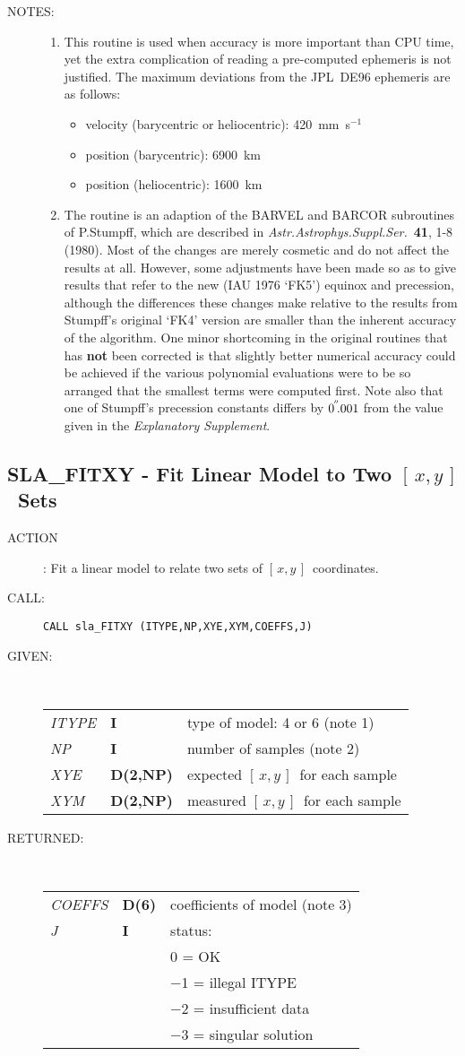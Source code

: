 \documentclass[11pt,twoside]{article}
\newcommand{\xlabel}[1]{}
\newcommand{\xy}        {$[\,x,y\,]$}
\newcommand{\arcsec}[2] {\arcseci{#1}$\hspace{-0.4em}.#2$}
\newcommand{\arcsec}[2] {
      {$#1\hspace{-0.05em}^{'\hspace{-0.1em}'}\hspace{-0.4em}.#2$}
   }
\newcommand{\arcseci}[1] {$#1\hspace{-0.05em}$\raisebox{-0.5ex}
                         {$^{'\hspace{-0.1em}'}$}}
\renewcommand{\arcseci}[1] {$#1\hspace{-0.05em}^{'\hspace{-0.1em}'}$}
\newcommand{\routine}[3]
{\hbadness=10000
  \vbox
  {
    \rule{\textwidth}{0.3mm}\\
    {\Large {\bf #1} \hfill #2 \hfill {\bf #1}}\\
    \setlength{\oldspacing}{\topsep}
    \setlength{\topsep}{0.3ex}
    \begin{description}
      #3
    \end{description}
    \setlength{\topsep}{\oldspacing}
  }
}
\renewcommand{\routine}[3]
   {
      \subsection{#1\xlabel{#1} - #2\label{#1}}
       \begin{description}
         #3
       \end{description}
   }
\newcommand{\action}[1]
{\item[ACTION]: #1}
\newcommand{\action}[1]
   {\item[ACTION:] #1}
\newcommand{\call}[1]
{\item[CALL]: \hspace{0.4em}{\tt #1}}
\newlength{\oldspacing}
\renewcommand{\call}[1]
   {
    \item[CALL:] {\tt #1}
   }
\newcommand{\args}[2]
{
  \goodbreak
  \setlength{\oldspacing}{\topsep}
  \setlength{\topsep}{0.3ex}
  \begin{description}
  \item[#1]:\\[1.5ex]
    \begin{tabular}{p{7em}p{6em}p{22em}}
      #2
    \end{tabular}
  \end{description}
  \setlength{\topsep}{\oldspacing}
}
\renewcommand{\args}[2]
   {
     \begin{description}
        \item[#1:]\\
        \begin{tabular}{p{7em}p{6em}l}
           #2
        \end{tabular}
     \end{description}
   }
\newcommand{\spec}[3]
{
  {\em {#1}} & {\bf \mbox{#2}} & {#3}
}
\newcommand{\notes}[1]
{
  \goodbreak
  \setlength{\oldspacing}{\topsep}
  \setlength{\topsep}{0.3ex}
  \begin{description}
    \item[NOTES]:
        #1
  \end{description}
  \setlength{\topsep}{\oldspacing}
}
\renewcommand{\notes}[1]
   {
      \begin{description}
         \item[NOTES:]
            #1
      \end{description}
   }
\begin{document}
\notes
{
 \begin{enumerate}
  \item This routine is used when accuracy is more important
        than CPU time, yet the extra complication of reading a
        pre-computed ephemeris is not justified.  The maximum
        deviations from the JPL~DE96 ephemeris are as follows:
        \begin{itemize}
         \item velocity (barycentric or heliocentric): 420~mm~s$^{-1}$
         \item position (barycentric): 6900~km
         \item position (heliocentric): 1600~km
        \end{itemize}
  \item The routine is an adaption of the BARVEL and BARCOR
        subroutines of P.Stumpff, which are described in
        {\it Astr.Astrophys.Suppl.Ser.}\ {\bf 41}, 1-8 (1980).
        Most of the changes are merely cosmetic and do not affect
        the results at all.  However, some adjustments have been
        made so as to give results that refer to the new (IAU 1976
        `FK5') equinox and precession, although the differences these
        changes make relative to the results from Stumpff's original
        `FK4' version are smaller than the inherent accuracy of the
        algorithm.  One minor shortcoming in the original routines
        that has {\bf not} been corrected is that slightly better
        numerical accuracy could be achieved if the various polynomial
        evaluations were to be so arranged that the smallest terms were
        computed first.  Note also that one of Stumpff's precession
        constants differs by \arcsec{0}{001} from the value given in the
        {\it Explanatory Supplement}.
 \end{enumerate}
}
\routine{SLA\_FITXY}{Fit Linear Model to Two \xy\ Sets}
{
 \action{Fit a linear model to relate two sets of \xy\ coordinates.}
 \call{CALL sla\_FITXY (ITYPE,NP,XYE,XYM,COEFFS,J)}
}
\args{GIVEN}
{
 \spec{ITYPE}{I}{type of model: 4 or 6 (note 1)} \\
 \spec{NP}{I}{number of samples (note 2)} \\
 \spec{XYE}{D(2,NP)}{expected \xy\ for each sample} \\
 \spec{XYM}{D(2,NP)}{measured \xy\ for each sample}
}
\args{RETURNED}
{
 \spec{COEFFS}{D(6)}{coefficients of model (note 3)} \\
 \spec{J}{I}{status:} \\
 \spec{}{}{\hspace{1.5em} 0 = OK} \\
 \spec{}{}{\hspace{0.7em} $-$1 = illegal ITYPE} \\
 \spec{}{}{\hspace{0.7em} $-$2 = insufficient data} \\
 \spec{}{}{\hspace{0.7em} $-$3 = singular solution}
}
\end{document}

